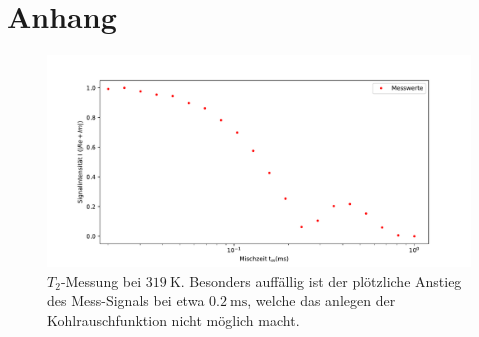 \section{Anhang}
\label{sec:anhang}

		\begin{figure}[H]
		    \centering
				\includegraphics[width=\textwidth]{Auswertung/Tempabh/Abb/T2/DMSO2_T2_319K.dat.nmr.pdf}
		    \caption{$T_2$-Messung bei $\SI{319}{\kelvin}$. Besonders auffällig ist der plötzliche
				Anstieg des Mess-Signals bei etwa $\SI{0,2}{\milli\second}$, welche das anlegen
				der Kohlrauschfunktion nicht möglich macht.}
		    \label{fig:T2err}
		\end{figure}
		\noindent
